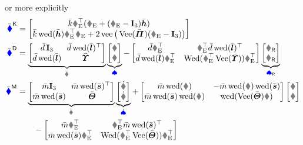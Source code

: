 or more explicitly
\begin{subequations}
\begin{align}
 \genForceStiffC
 &= \begin{bmatrix} \kc \RE^\top (\rE + (\RE-\idMat[3])\hc) \\ \kc \wedOp(\hc) \RE^\top \rE + 2 \veeOp\big( \veeMatOp(\kapc) (\RE-\idMat[3]) \big) \end{bmatrix}
\\
 \genForceDissC 
 &= \underbrace{\begin{bmatrix} \dc \,\idMat[3] & \!\!\dc \wedOp(\lc)^\top \\ \dc \wedOp(\lc) & \sigc \end{bmatrix}}_{\bodyDissMatC{}{}} \underbrace{\begin{bmatrix} \v \\ \w \end{bmatrix}}_{\sysVel}
 - \begin{bmatrix} \dc\RE^\top & \RE^\top \dc \wedOp(\lc)^\top \\ \dc\wedOp(\lc) \RE^\top & \wedMatOp(\RE^\top \veeMatOp(\sigc)) \RE^\top \end{bmatrix}
 \underbrace{\begin{bmatrix} \vR \\ \wR \end{bmatrix}}_{\sysVelR}
\\
 \genForceInertiaC 
 &= \underbrace{\begin{bmatrix} \mc \idMat[3] & \!\!\mc \wedOp(\sc)^\top \\ \mc \wedOp(\sc) & \Jc \end{bmatrix}}_{\bodyInertiaMatC{}{}} \underbrace{\begin{bmatrix} \vd \\ \wdot \end{bmatrix}}_{\sysVeld}
 + \begin{bmatrix} \mc \wedOp(\w) & -\mc \wedOp(\w) \wedOp(\sc) \\ \mc \wedOp(\sc) \wedOp(\w) & \wedOp(\veeMatOp(\Jc)\w) \end{bmatrix} \begin{bmatrix} \v \\ \w \end{bmatrix}
\nonumber\\
 &\qquad
 - \begin{bmatrix} \mc\RE^\top & \RE^\top \mc \wedOp(\sc)^\top \\ \mc\wedOp(\sc) \RE^\top & \wedMatOp(\RE^\top \veeMatOp(\Jc)) \RE^\top \end{bmatrix}

\end{align}
\end{subequations}
